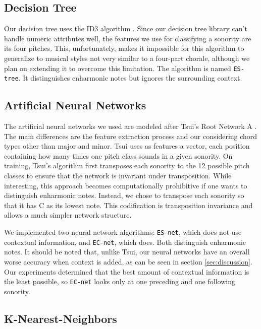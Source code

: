 \documentclass{article}
\begin{document}
\subsection{Decision Tree}
\label{sec:tree}

Our decision tree uses the ID3 algorithm \cite{mitchell97:machine}.
Since our decision tree library can't handle numeric attributes well,
the features we use for classifying a sonority are its four
pitches. This, unfortunately, makes it impossible for this algorithm
to generalize to musical styles not very similar to a four-part
chorale, although we plan on extending it to overcome this
limitation. The algorithm is named \texttt{ES-tree}. It distinguishes
enharmonic notes but ignores the surrounding context.

\subsection{Artificial Neural Networks}
\label{sec:neural-net}


The artificial neural networks we used are modeled after Tsui's Root
Network A \cite{tsui02:harmonic}. The main differences are the feature
extraction process and our considering chord types other than major
and minor. Tsui uses as features a vector, each position containing
how many times one pitch class sounds in a given sonority.  On
training, Tsui's algorithm first transposes each sonority to the 12
possible pitch classes to ensure that the network is invariant under
transposition. While interesting, this approach becomes
computationally prohibitive if one wants to distinguish enharmonic
notes. Instead, we chose to transpose each sonority so that it has C
as its lowest note. This codification is transposition invariance and
allows a much simpler network structure.

We implemented two neural network algorithms: \texttt{ES-net}, which
does not use contextual information, and \texttt{EC-net}, which
does. Both distinguish enharmonic notes.  It should be noted that,
unlike Tsui, our neural networks have an overall worse accuracy when
context is added, as can be seen in section \ref{sec:discussion}. Our
experiments determined that the best amount of contextual information
is the least possible, so \texttt{EC-net} looks only at one preceding
and one following sonority.


\subsection{K-Nearest-Neighbors}
\label{sec:knn}
\end{document}
